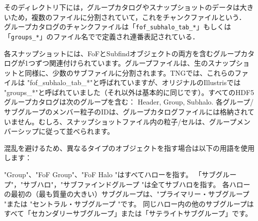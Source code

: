 そのディレクトリ下には，グループカタログやスナップショットのデータは大きいため，複数のファイルに分割されていて，これをチャンクファイルという． グループカタログのチャンクファイルは「\texttt{fof\_subhalo\_tab\_*}」もしくは「\texttt{groups\_*}」のファイル名でで定義され連番表記されている．


各スナップショットには、FoFとSubfindオブジェクトの両方を含むグループカタログが1つずつ関連付けられています。グループファイルは、生のスナップショットと同様に、少数のサブファイルに分割されます。TNGでは、これらのファイルは "fof\_subhalo\_tab\_*"と呼ばれていますが、オリジナルのIllustrisでは "groups\_*"と呼ばれていました（それ以外は基本的に同じです）。すべてのHDF5グループカタログは次のグループを含む： Header, Group, Subhalo. 各グループ/サブグループのメンバー粒子のIDは、グループカタログファイルには格納されていません。むしろ、スナップショットファイル内の粒子/セルは、グループメンバーシップに従って並べられます。

混乱を避けるため、異なるタイプのオブジェクトを指す場合は以下の用語を使用します：

    "Group"、"FoF Group"、"FoF Halo "はすべてハローを指す。
    「サブグループ"，"サブハロ"，"サブファインドグループ "は全てサブハロを指す。
    各ハローの最初の（最も質量の大きい）サブグループは、"プライマリー・サブグループ "または "セントラル・サブグループ "です。
    同じハロー内の他のサブグループはすべて「セカンダリーサブグループ」または「サテライトサブグループ」です。
